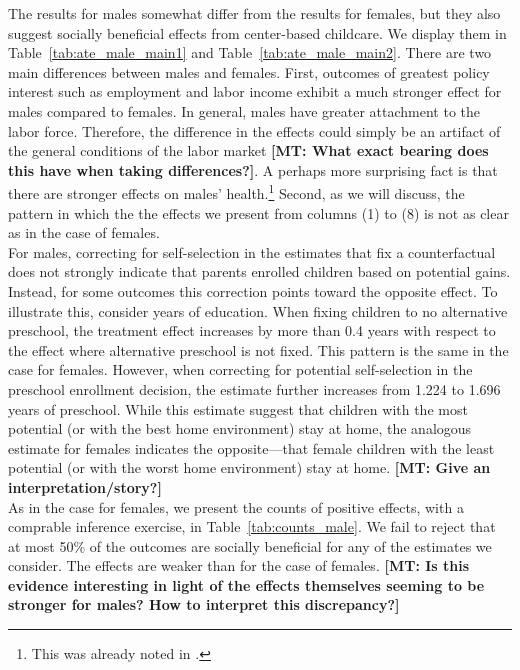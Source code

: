 



\noindent The results for males somewhat differ from the results for females, but they also suggest socially beneficial effects from center-based childcare. We display them in Table~\ref{tab:ate_male_main1} and Table~\ref{tab:ate_male_main2}. There are two main differences between males and females. First, outcomes of greatest policy interest such as employment and labor income exhibit a much stronger effect for males compared to females. In general, males have greater attachment to the labor force. Therefore, the difference in the effects could simply be an artifact of the general conditions of the labor market \textbf{[MT: What exact bearing does this have when taking differences?]}. A perhaps more surprising fact is that there are stronger effects on males' health.\footnote{This was already noted in \citet{Campbell_Conti_etal_2014_EarlyChildhoodInvestments}.} Second, as we will discuss, the pattern in which the the effects we present from columns (1) to (8) is not as clear as in the case of females.\\

\noindent For males, correcting for self-selection in the estimates that fix a counterfactual does not strongly indicate that parents enrolled children based on potential gains. Instead, for some outcomes this correction points toward the opposite effect. To illustrate this, consider years of education. When fixing children to no alternative preschool, the treatment effect increases by more than 0.4 years with respect to the effect where alternative preschool is not fixed. This pattern is the same in the case for females. However, when correcting for potential self-selection in the preschool enrollment decision, the estimate further increases from 1.224 to 1.696 years of preschool. While this estimate suggest that children with the most potential (or with the best home environment) stay at home, the analogous estimate for females indicates the opposite---that female children with the least potential (or with the worst home environment) stay at home. \textbf{[MT: Give an interpretation/story?]}\\

\noindent As in the case for females, we present the counts of positive effects, with a comprable inference exercise, in Table~\ref{tab:counts_male}. We fail to reject that at most 50\% of the outcomes are socially beneficial for any of the estimates we consider. The effects are weaker than for the case of females. \textbf{[MT: Is this evidence interesting in light of the effects themselves seeming to be stronger for males? How to interpret this discrepancy?]}

